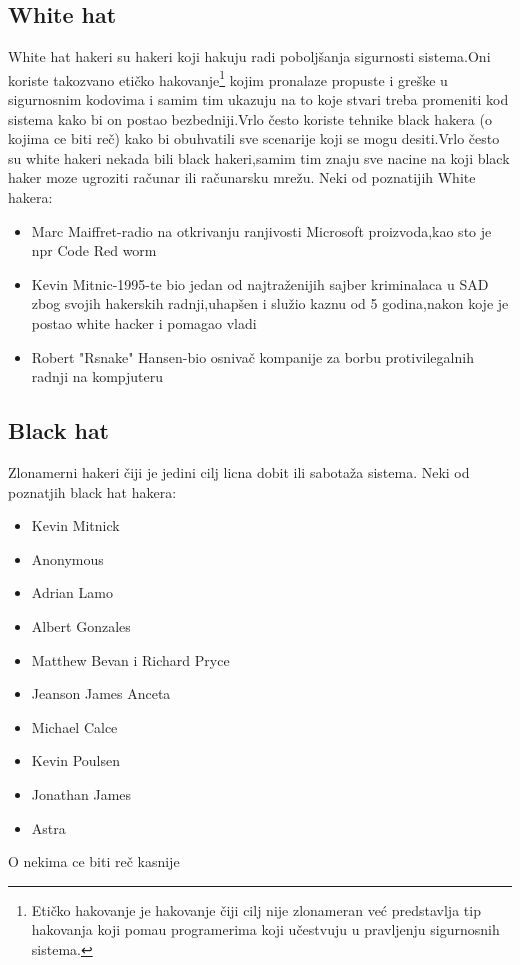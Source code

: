 \documentclass[a4paper]{article}
\begin{document}
\subsection{White hat}
\label{subsec:podnaslov1}
White hat hakeri su hakeri koji hakuju radi poboljšanja sigurnosti sistema.Oni koriste takozvano etičko hakovanje\footnote{Etičko hakovanje je hakovanje čiji cilj nije zlonameran već predstavlja tip hakovanja koji pomau programerima koji učestvuju u pravljenju sigurnosnih sistema.} kojim pronalaze propuste i greške u sigurnosnim kodovima i samim tim ukazuju na to koje stvari treba promeniti kod sistema kako bi on postao bezbedniji.Vrlo često koriste tehnike black hakera (o kojima ce biti reč) kako bi obuhvatili sve scenarije koji se mogu desiti.Vrlo često su white hakeri nekada bili black hakeri,samim tim znaju sve nacine na koji black haker moze ugroziti računar ili računarsku mrežu.
\newline
\newline
Neki od poznatijih White hakera:
\begin{itemize}
	\item Marc Maiffret-radio na otkrivanju ranjivosti Microsoft proizvoda,kao sto je npr Code Red worm
	\item Kevin Mitnic-1995-te bio jedan od najtraženijih sajber kriminalaca u SAD zbog svojih hakerskih radnji,uhapšen i služio kaznu od 5 godina,nakon koje je postao white hacker i pomagao vladi
	\item Robert "Rsnake" Hansen-bio osnivač kompanije za borbu protivilegalnih radnji na kompjuteru
\end{itemize}
\subsection{Black hat}
\label{subsec:podnaslov2}
Zlonamerni hakeri čiji je jedini cilj licna dobit ili sabotaža sistema.
\newline
Neki od poznatjih black hat hakera:
\begin{itemize}
	\item Kevin Mitnick
	\item Anonymous
	\item Adrian Lamo
	\item Albert Gonzales
	\item Matthew Bevan i Richard Pryce
	\item Jeanson James Anceta
	\item Michael Calce
	\item Kevin Poulsen
	\item Jonathan James
	\item Astra
\end{itemize}
O nekima ce biti reč kasnije
\end{document}

